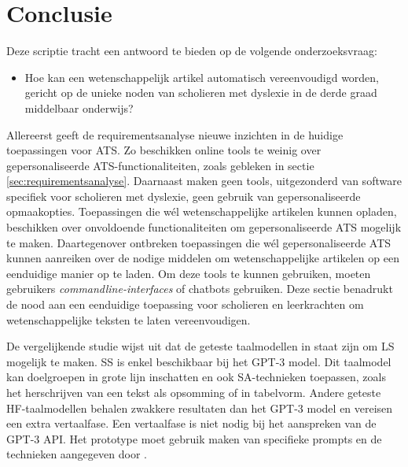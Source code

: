 
\chapter{Conclusie}%
\label{ch:conclusie}

Deze scriptie tracht een antwoord te bieden op de volgende onderzoeksvraag:

\begin{itemize}
	\item Hoe kan een wetenschappelijk artikel automatisch vereenvoudigd worden, gericht op de unieke noden van scholieren met dyslexie in de derde graad middelbaar onderwijs?
\end{itemize}

Allereerst geeft de requirementsanalyse nieuwe inzichten in de huidige toepassingen voor ATS. Zo beschikken online tools te weinig over gepersonaliseerde ATS-functionaliteiten, zoals gebleken in sectie \ref{sec:requirementsanalyse}. Daarnaast maken geen tools, uitgezonderd van software specifiek voor scholieren met dyslexie, geen gebruik van gepersonaliseerde opmaakopties. Toepassingen die wél wetenschappelijke artikelen kunnen opladen, beschikken over onvoldoende functionaliteiten om gepersonaliseerde ATS mogelijk te maken. Daartegenover ontbreken toepassingen die wél gepersonaliseerde ATS kunnen aanreiken over de nodige middelen om wetenschappelijke artikelen op een eenduidige manier op te laden. Om deze tools te kunnen gebruiken, moeten gebruikers \textit{commandline-interfaces} of chatbots gebruiken. Deze sectie benadrukt de nood aan een eenduidige toepassing voor scholieren en leerkrachten om wetenschappelijke teksten te laten vereenvoudigen.

\medspace

De vergelijkende studie wijst uit dat de geteste taalmodellen in staat zijn om LS mogelijk te maken. SS is enkel beschikbaar bij het GPT-3 model. Dit taalmodel kan doelgroepen in grote lijn inschatten en ook SA-technieken toepassen, zoals het herschrijven van een tekst als opsomming of in tabelvorm. Andere geteste HF-taalmodellen behalen zwakkere resultaten dan het GPT-3 model en vereisen een extra vertaalfase. Een vertaalfase is niet nodig bij het aanspreken van de GPT-3 API. Het prototype moet gebruik maken van specifieke prompts en de technieken aangegeven door \textcite{McFarland2023, White2023}.

